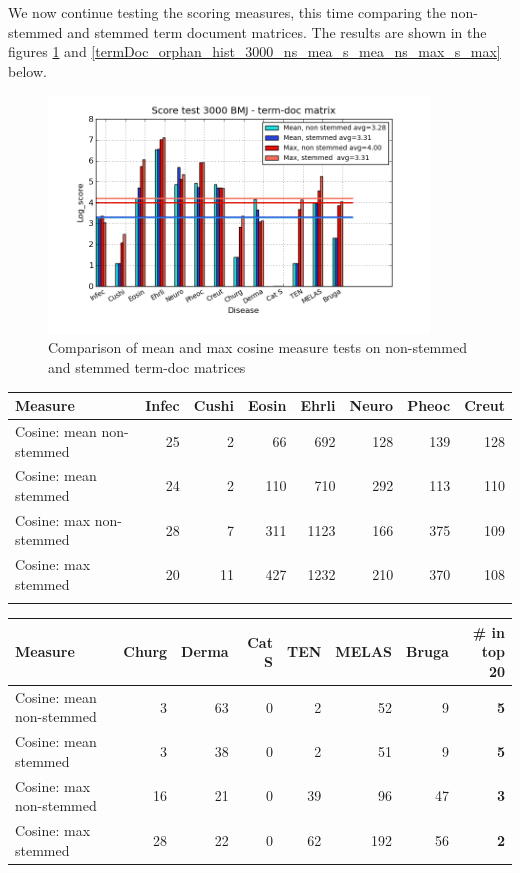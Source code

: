 We now continue testing the scoring measures, this time comparing the
non-stemmed and stemmed term document matrices. The results are shown
in the figures \ref{termDoc_bmj_hist_3000_ns_mea_s_mea_ns_max_s_max}
and \ref{termDoc_orphan_hist_3000_ns_mea_s_mea_ns_max_s_max} below.

\begin{figure}[H]
        \begin{center}
          \includegraphics[width=0.9\textwidth]{barcharts/termDoc_bmj_hist_3000_ns_mea_s_mea_ns_max_s_max.png}
        \end{center}
        \caption{Comparison of mean and max cosine measure tests on non-stemmed and stemmed term-doc matrices}
        \label{termDoc_bmj_hist_3000_ns_mea_s_mea_ns_max_s_max}
\end{figure}

\begin{table}[H]
  \begin{tiny}
  \label{testResult}
  \begin{tabular}{|l|r|r|r|r|r|r|r|}
    \hline
    Measure &Infec&Cushi&Eosin&Ehrli&Neuro&Pheoc&Creut \\
    \hline
    Cosine: mean non-stemmed &25&2&66&692&128&139&128 \\
    \hline
    Cosine: mean stemmed &24&2&110&710&292&113&110 \\
    \hline
    Cosine: max non-stemmed &28&7&311&1123&166&375&109 \\
    \hline
    Cosine: max stemmed &20&11&427&1232&210&370&108 \\
    \hline
  \multicolumn{8}{c}{} \\
  \end{tabular}
  \begin{tabular}{|l|r|r|r|r|r|r|r|}
    \hline
    Measure &Churg&Derma&Cat S&TEN&MELAS&Bruga& \scriptsize{\textbf{\# in top 20}} \\
    \hline
    Cosine: mean non-stemmed &3&63&0&2&52&9& \scriptsize{\textbf{5}} \\
    \hline
    Cosine: mean stemmed &3&38&0&2&51&9& \scriptsize{\textbf{5}}\\
    \hline
    Cosine: max non-stemmed &16&21&0&39&96&47& \scriptsize{\textbf{3}} \\
    \hline
    Cosine: max stemmed &28&22&0&62&192&56& \scriptsize{\textbf{2}} \\
    \hline
  \end{tabular}
  \end{tiny}
\end{table}

